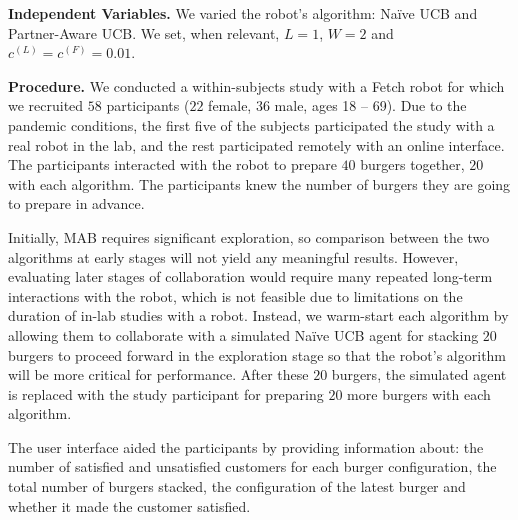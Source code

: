 \documentclass[letterpaper]{article} %
\theoremstyle{definition}
\begin{document}
\smallskip
\noindent\textbf{Independent Variables.} We varied the robot's algorithm: Na\"ive UCB and Partner-Aware UCB. We set, when relevant, $L=1$, $W=2$ and $c^{(L)}=c^{(F)}=0.01$.

\smallskip
\noindent\textbf{Procedure.} We conducted a within-subjects study with a Fetch robot \cite{wise2016fetch} for which we recruited $58$ participants ($22$ female, $36$ male, ages 18 -- 69).
Due to the pandemic conditions, the first five of the subjects participated the study with a real robot in the lab, and the rest participated remotely with an online interface.
The participants interacted with the robot to prepare $40$ burgers together, $20$ with each algorithm. The participants knew the number of burgers they are going to prepare in advance.

Initially, MAB requires significant exploration, so comparison between the two algorithms at early stages will not yield any meaningful results. However, evaluating later stages of collaboration would require many repeated long-term interactions with the robot, which is not feasible due to limitations on the duration of in-lab studies with a robot. Instead, we warm-start each algorithm by allowing them to collaborate with a simulated Na\"ive UCB agent for stacking $20$ burgers to proceed forward in the exploration stage so that the robot's algorithm will be more critical for performance. After these $20$ burgers, the simulated agent is replaced with the study participant for preparing $20$ more burgers with each algorithm. 

The user interface aided the participants by providing information about: the number of satisfied and unsatisfied customers for each burger configuration, the total number of burgers stacked, the configuration of the latest burger and whether it made the customer satisfied.
\end{document}
